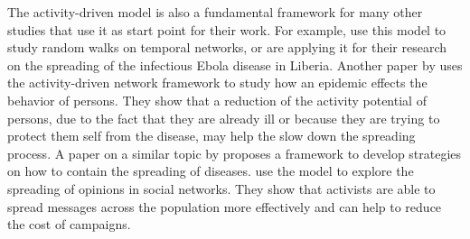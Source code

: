 The activity-driven model is also a fundamental framework for many other studies that use it as start point for their work.
For example, \citet{Perra2012b} use this model to study random walks on temporal networks, or \citet{Rizzo2016} are applying it for their research on the spreading of the infectious Ebola disease in Liberia.
Another paper by \citet{Rizzo2014} uses the activity-driven network framework to study how an epidemic effects the behavior of persons.
They show that a reduction of the activity potential of persons, due to the fact that they are already ill or because they are trying to protect them self from the disease, may help the slow down the spreading process.
A paper on a similar topic by \citet{Liu2014} proposes a framework to develop strategies on how to contain the spreading of diseases.
\citet{Mistry2015} use the model to explore the spreading of opinions in social networks.
They show that activists are able to spread messages across the population more effectively and can help to reduce the cost of campaigns.

